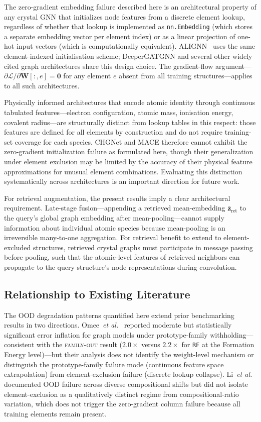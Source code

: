 \documentclass[final,5p,twocolumn,10pt]{elsarticle}
\newcommand{\famout}{\textsc{family-out}}
\newcommand{\rf}{\texttt{RF}}
\newcommand{\etal}{\textit{et al.}}
\begin{document}
The zero-gradient embedding failure described here is an architectural property
of any crystal GNN that initializes node features from a discrete element lookup,
regardless of whether that lookup is implemented as \texttt{nn.Embedding}
(which stores a separate embedding vector per element index) or as a linear
projection of one-hot input vectors (which is computationally equivalent).
ALIGNN~\cite{choudhary2021atomistic} uses the same element-indexed
initialisation scheme; DeeperGATGNN and several other widely cited graph
architectures share this design choice. The gradient-flow argument---
$\partial \mathcal{L}/\partial \bm{W}[:,e]=\mathbf{0}$ for any element $e$
absent from all training structures---applies to all such architectures.

Physically informed architectures that encode atomic identity through
continuous tabulated features---electron configuration, atomic mass,
ionisation energy, covalent radius---are structurally distinct from lookup tables
in this respect: those features are defined for all elements by construction
and do not require training-set coverage for each species. CHGNet and
MACE therefore cannot exhibit the zero-gradient initialization failure as
formulated here, though their generalization under element exclusion may
be limited by the accuracy of their physical feature approximations for
unusual element combinations. Evaluating this distinction systematically
across architectures is an important direction for future work.

For retrieval augmentation, the present results imply a clear architectural
requirement. Late-stage fusion---appending a retrieved mean-embedding
$\bar{\bm{z}}_{\text{ret}}$ to the query's global graph embedding after
mean-pooling---cannot supply information about individual atomic species
because mean-pooling is an irreversible many-to-one aggregation.
For retrieval benefit to extend to element-excluded structures, retrieved
crystal graphs must participate in message passing before pooling, such that
the atomic-level features of retrieved neighbors can propagate to the
query structure's node representations during convolution.

\subsection{Relationship to Existing Literature}

The OOD degradation patterns quantified here extend prior benchmarking results
in two directions. Omee~\etal{}~\cite{omee2024} reported moderate but
statistically significant error inflation for graph models under prototype-family
withholding---consistent with the \famout{} result ($2.0\times$ versus $2.2\times$
for \rf{} at the Formation Energy level)---but their analysis does not
identify the weight-level mechanism or distinguish the prototype-family failure
mode (continuous feature space extrapolation) from element-exclusion failure
(discrete lookup collapse). Li~\etal{}~\cite{li2024} documented OOD failure
across diverse compositional shifts but did not isolate element-exclusion as
a qualitatively distinct regime from compositional-ratio variation, which does
not trigger the zero-gradient column failure because all training elements
remain present.
\end{document}
